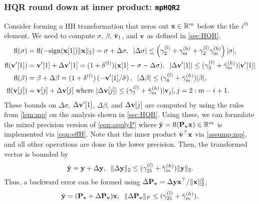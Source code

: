 \subsubsection{HQR round down at inner product: {\tt mpHQR2}}
Consider forming a HH transformation that zeros out $\mathbf{x}\in\mathbb{R}^m$ below the the $i^{th}$ element. 
We need to compute $\sigma$, $\beta$, $\tilde{\mathbf{v}}_1$, and $\mathbf{v}$ as defined in \cref{sec:HQR},
\begin{align}
\fl(\sigma) &= \fl(-\rm{sign}(\bb{x}[1])\|\bb{x}\|_2) = \sigma + \Delta \sigma,\;\;|\Delta\sigma| \leq \left(\gamma_{2}^{(l)}+\gamma_{m}^{(h)}+\gamma_{2}^{(l)}\gamma_{m}^{(h)}\right)|\sigma|,\label{eqn:mpsigma}\\
\fl(\bb{v}'[1])& =\bb{v}'[1] + \Delta \bb{v}'[1] = (1+\dd^{(l)}) (\bb{x}[1]-\sigma-\Delta\sigma), \;\;|\Delta\bb{v}'[1]| \leq (\gamma_{3}^{(l)}+\tilde{\gamma}_{m}^{(h)})|\bb{v}'[1]| \label{eqn:mpv1}\\
\fl(\beta) &= \beta +\Delta \beta= (1+\dd^{(l)})\left(-\bb{v}'[1]/\hat{\sigma}\right), \;\; |\Delta\beta| \leq (\gamma_{8}^{(l)}+\tilde{\gamma}_{m}^{(h)})|\beta|, \label{eqn:mpbeta}\\
	\fl(\bb{v}[j])	&= \bb{v}[j] + \Delta \bb{v}[j]\text{ where }|\Delta \bb{v}[j]|\leq 
	(\gamma_{7}^{(l)} + \tilde{\gamma}_{m}^{(h)})|\bb{v}_j|,j=2:m-i+1 \label{eqn:mpv}.
\end{align}
These bounds on $\Delta\sigma$, $\Delta \mathbf{v}'[1]$, $\Delta \beta$, and $\Delta \mathbf{v}[j]$ are computed by using the rules from \cref{lem:mp} on the analysis shown in \cref{sec:HQR}.
Using these, we can formulate the mixed precision version of \cref{eqn:applyP} where $\hat{\mathbf{y}}=\mathrm{fl}(\mathbf{P_vx})\in\mathbb{R}^m$ is implemented via \cref{eqn:effH}.
Note that the inner product $\hat{\mathbf{v}}^{\top}\mathbf{x}$ via \cref{assump:mp}, and all other operations are done in the lower precision.
Then, the transformed vector is bounded by
\begin{equation}
	\hat{\bb{y}} = \bb{y}+\Delta \bb{y},\;\; \|\Delta \bb{y}\|_2 \leq (\gamma_{25}^{(l)} + \tilde{\gamma}_{m}^{(h)})\|\bb{y}\|_2.\label{eqn:mpdelty}
\end{equation}
Thus, a backward error can be formed using $\Delta \mathbf{P_v} = \Delta \mathbf{y}\mathbf{x}^{
\top}/\|\mathbf{x}\|_2^2$,
\begin{equation}
	\hat{\bb{y}} = (\bb{P_v} + \Delta \bb{P_v})\bb{x},\;\; \|\Delta \bb{P_v}\|_F\leq (\gamma_{25}^{(l)} + \tilde{\gamma}_{m}^{(h)}). \label{eqn:mpapplyP}
\end{equation}
